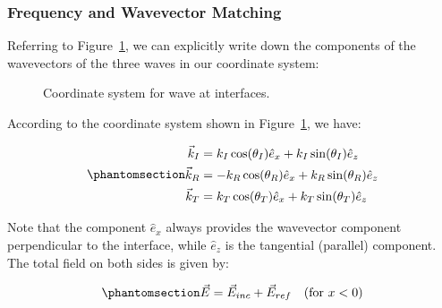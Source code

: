 \documentclass[
  a4paper,
]{book}
\begin{document}
\subsubsection{Frequency and Wavevector
Matching}\label{frequency-and-wavevector-matching}

Referring to Figure~\ref{fig-coordinates}, we can explicitly write down
the components of the wavevectors of the three waves in our coordinate
system:

\begin{figure}


\caption{\label{fig-coordinates}Coordinate system for wave at
interfaces.}

\end{figure}%

According to the coordinate system shown in
Figure~\ref{fig-coordinates}, we have:

\begin{equation}\phantomsection\label{eq-wavevectors}{
\begin{aligned}
  \vec{k}_I &=  k_I \cos(\theta_I)\hat{e}_x+k_I \sin(\theta_I)\hat{e}_z \\
  \vec{k}_R &=  -k_R \cos(\theta_R)\hat{e}_x+k_R \sin(\theta_R)\hat{e}_z \\
  \vec{k}_T &=  k_T \cos(\theta_T)\hat{e}_x+k_T \sin(\theta_T)\hat{e}_z
\end{aligned}
}\end{equation}

Note that the component \(\hat{e}_x\) always provides the wavevector
component perpendicular to the interface, while \(\hat{e}_z\) is the
tangential (parallel) component. The total field on both sides is given
by:

\begin{equation}\phantomsection\label{eq-total-field-left}{
\vec{E}=\vec{E}_{inc}+\vec{E}_{ref}
\quad \text{(for } x<0 \text{)}
}\end{equation}
\end{document}
